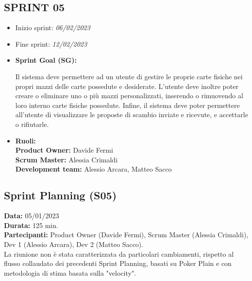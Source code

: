 \documentclass[a4paper, oneside]{article}
\newcommand\cinque{Scrum Master (Alessia Crimaldi), Dev 1 (Alessio Arcara), Dev 2 (Matteo Sacco).}
\newcommand\cinqueP{Product Owner (Davide Fermi), }
\begin{document}
\begin{landscape}
        \section{SPRINT 05}
        \begin{itemize}
            \item Inizio sprint: \textit{06/02/2023}
            \item Fine sprint: \textit{12/02/2023}
        \end{itemize}
        \begin{itemize}
            \item \textbf{Sprint Goal (SG):}
            \begin{indent}
                \newline Il sistema deve permettere ad un utente di gestire le proprie carte fisiche nei propri mazzi delle carte possedute e desiderate. L'utente deve inoltre poter creare o eliminare uno o più mazzi personalizzati, inserendo o rimuovendo al loro interno carte fisiche possedute. Infine, il sistema deve poter permettere all'utente di visualizzare le proposte di scambio inviate e ricevute, e accettarle o rifiutarle.
            \end{indent}
        \end{itemize}
        \begin{itemize}
            \item \textbf{Ruoli:}\\
            \textbf{Product Owner:} Davide Fermi\\
            \textbf{Scrum Master:} Alessia Crimaldi\\
            \textbf{Development team:} Alessio Arcara, Matteo Sacco\\
        \end{itemize}
        \vspace{2mm} %
        \subsection{Sprint Planning (S05)}
        \textbf{Data:} 05/01/2023\\
        \textbf{Durata:} 125 min.\\
        \textbf{Partecipanti:} \cinqueP \cinque\\
        \newline La riunione non è stata caratterizzata da particolari cambiamenti, rispetto al flusso collaudato dei precedenti Sprint Planning, basati su Poker Plain e con metodologia di stima basata sulla "velocity".


\end{landscape}
\end{document}
